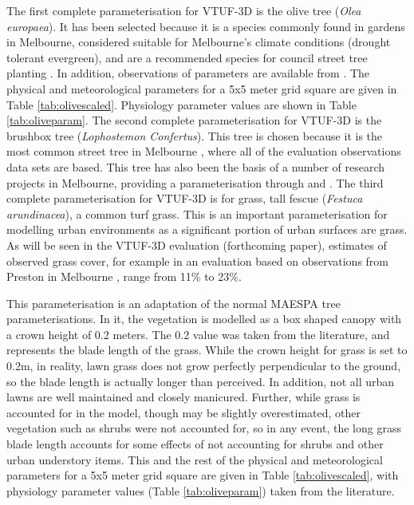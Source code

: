 \documentclass[final,3p,times,authoryear]{elsarticle}
\begin{document}
The first complete parameterisation for VTUF-3D is the olive tree (\textit{Olea europaea}). It has been selected because it is a species commonly found in gardens in Melbourne, considered suitable for Melbourne's climate conditions (drought tolerant evergreen), and are a recommended species for council street tree planting \citep{PortPhillip2010}. In addition, observations of parameters are available from \cite{Coutts2014a}. The physical and meteorological parameters for a 5x5 meter grid square are given in Table \ref{tab:olivescaled}. Physiology parameter values are shown in Table \ref{tab:oliveparam}. The second complete parameterisation for VTUF-3D is the  brushbox tree (\textit{Lophostemon Confertus}). This tree is chosen because it is the most common street tree in Melbourne \citep{Frank2006}, where all of the evaluation observations data sets are based. This tree has also been the basis of a number of research projects in Melbourne, providing a parameterisation through \cite{Coutts2016} and \cite{Coutts2015ICUC}. The third complete parameterisation for VTUF-3D is for grass, tall fescue (\textit{Festuca arundinacea}), a common turf grass. This is an important parameterisation for modelling urban environments as a significant portion of urban surfaces are grass. As will be seen in the VTUF-3D evaluation (forthcoming paper), estimates of observed grass cover, for example in an evaluation based on observations from Preston in Melbourne \citep{Coutts2007,Nury2015}, range from 11\% to 23\%. 

This parameterisation is an adaptation of the normal MAESPA tree parameterisations. In it, the vegetation is modelled as a box shaped canopy with a crown height of 0.2 meters. The 0.2 value was taken from the literature, and represents the blade length of the grass. While the crown height for grass is set to 0.2m, in reality, lawn grass does not grow perfectly perpendicular to the ground, so the blade length is actually longer than perceived. In addition, not all urban lawns are well maintained and closely manicured. Further, while grass is accounted for in the model, though may be slightly overestimated, other vegetation such as shrubs were not accounted for, so in any event, the long grass blade length accounts for some effects of not accounting for shrubs and other urban understory items. This and the rest of the physical and meteorological parameters for a 5x5 meter grid square are given in Table \ref{tab:olivescaled}, with physiology parameter values (Table \ref{tab:oliveparam}) taken from the literature.
\end{document}
